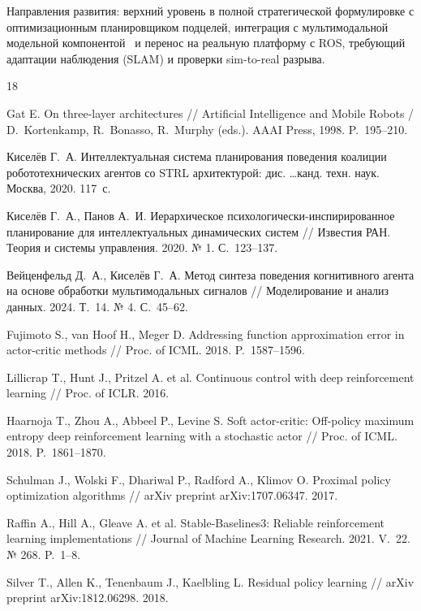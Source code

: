 \documentclass[11pt]{article}
\begin{document}
Направления развития: верхний уровень в полной стратегической формулировке с оптимизационным планировщиком подцелей, интеграция с мультимодальной модельной компонентой~\cite{veitsenfeld2024} и перенос на реальную платформу с ROS, требующий адаптации наблюдения (SLAM) и проверки sim-to-real разрыва.


{\footnotesize\begin{thebibliography}{18}

Gat E. On three-layer architectures
// Artificial Intelligence and Mobile Robots / D.~Kortenkamp, R.~Bonasso, R.~Murphy (eds.). AAAI Press, 1998. P.~195--210.

Киселёв Г.~А. Интеллектуальная система планирования поведения коалиции робототехнических агентов со STRL архитектурой:
дис. \dots канд. техн. наук. Москва, 2020. 117~с.

Киселёв Г.~А., Панов А.~И. Иерархическое психологически-инспирированное планирование для интеллектуальных динамических систем
// Известия РАН. Теория и системы управления. 2020. № 1. С.~123--137.

Вейценфельд Д.~А., Киселёв Г.~А. Метод синтеза поведения когнитивного агента на основе обработки мультимодальных сигналов
// Моделирование и анализ данных. 2024. Т.~14. № 4. С.~45--62.

Fujimoto S., van Hoof H., Meger D. Addressing function approximation error in actor-critic methods
// Proc. of ICML. 2018. P.~1587--1596.

Lillicrap T., Hunt J., Pritzel A. et al. Continuous control with deep reinforcement learning
// Proc. of ICLR. 2016.

Haarnoja T., Zhou A., Abbeel P., Levine S. Soft actor-critic: Off-policy maximum entropy deep reinforcement learning with a stochastic actor
// Proc. of ICML. 2018. P.~1861--1870.

Schulman J., Wolski F., Dhariwal P., Radford A., Klimov O. Proximal policy optimization algorithms
// arXiv preprint arXiv:1707.06347. 2017.

Raffin A., Hill A., Gleave A. et al. Stable-Baselines3: Reliable reinforcement learning implementations
// Journal of Machine Learning Research. 2021. V.~22. № 268. P.~1--8.

Silver T., Allen K., Tenenbaum J., Kaelbling L. Residual policy learning
// arXiv preprint arXiv:1812.06298. 2018.


\end{thebibliography}}
\end{document}
